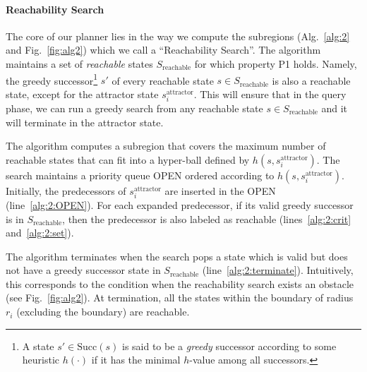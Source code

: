 \documentclass[letterpaper]{article} %
\newcommand{\sAttract}{\ensuremath{s^{\text{attractor}}_i}\xspace}
\begin{document}
\paragraph*{Reachability Search}
The core of our planner lies in the way we compute the subregions (Alg.~\ref{alg:2} and Fig.~\ref{fig:alg2}) which we call a ``Reachability Search''. The algorithm maintains a set of \emph{reachable} states $S_{\text{reachable}}$ for which property P1 holds. 
Namely, the greedy successor\footnote{A state $s' \in \text{Succ}(s)$ is said to be a \emph{greedy} successor according to some heuristic $h(\cdot)$ if it has the minimal $h$-value  among all successors.} $s'$ of every reachable state $s \in S_{\text{reachable}}$ is also a reachable state, except for the attractor state \sAttract. 
This will ensure that in the query phase, we can run a greedy search from any reachable state $s \in S_{\text{reachable}}$ and it will terminate in the attractor state. 

The algorithm computes a subregion that covers the maximum number of reachable states that can fit into a hyper-ball defined by $h(s,\sAttract)$. 
The search maintains a priority queue OPEN ordered according to $h(s,\sAttract)$. Initially, the predecessors of $\sAttract$ are inserted in the OPEN (line~\ref{alg:2:OPEN}). For each expanded predecessor, if its valid greedy successor is in $S_{\text{reachable}}$, then the predecessor is also labeled as reachable (lines~\ref{alg:2:crit} and~\ref{alg:2:set}). 


The algorithm terminates when the search pops a state which is valid but does not have a greedy successor state in $S_{\text{reachable}}$ (line~\ref{alg:2:terminate}). Intuitively, this corresponds to the condition when the reachability search exists an obstacle (see Fig.~\ref{fig:alg2}). At termination, all the states within the boundary of radius $r_i$ (excluding the boundary) are reachable.
\end{document}
